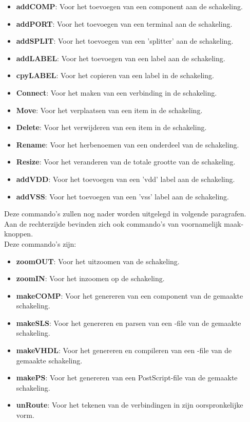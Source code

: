 \begin{itemize}
\begin{itemize}
\item {\bf addCOMP}: Voor het toevoegen van een component aan de schakeling.
\item {\bf addPORT}: Voor het toevoegen van een terminal aan de schakeling.
\item {\bf addSPLIT}: Voor het toevoegen van een 'splitter' aan de schakeling.
\item {\bf addLABEL}: Voor het toevoegen van een label aan de schakeling.
\item {\bf cpyLABEL}: Voor het copieren van een label in de schakeling.
\item {\bf Connect}: Voor het maken van een verbinding in de schakeling.
\item {\bf Move}: Voor het verplaatsen van een item in de schakeling.
\item {\bf Delete}: Voor het verwijderen van een item in de schakeling.
\item {\bf Rename}: Voor het herbenoemen van een onderdeel van de schakeling.
\item {\bf Resize}: Voor het veranderen van de totale grootte van de schakeling.
\item {\bf addVDD}: Voor het toevoegen van een 'vdd' label aan de schakeling.
\item {\bf addVSS}: Voor het toevoegen van een 'vss' label aan de schakeling.
\end{itemize}
Deze commando's zullen nog nader worden uitgelegd in volgende paragrafen.\\
Aan de rechterzijde bevinden zich ook commando's van voornamelijk maak-knoppen.\\
Deze commando's zijn:
\begin{itemize}
\item {\bf zoomOUT}: Voor het uitzoomen van de schakeling.
\item {\bf zoomIN}: Voor het inzoomen op de schakeling.
\item {\bf makeCOMP}: Voor het genereren van een component van de gemaakte schakeling.
\item {\bf makeSLS}: Voor het genereren en parsen van een -file van de gemaakte schakeling.
\item {\bf makeVHDL}: Voor het genereren en compileren van een -file van de gemaakte schakeling.
\item {\bf makePS}: Voor het genereren van een PostScript-file van de gemaakte schakeling.
\item {\bf unRoute}: Voor het tekenen van de verbindingen in zijn oorspronkelijke vorm.

\end{itemize}
\end{itemize}
